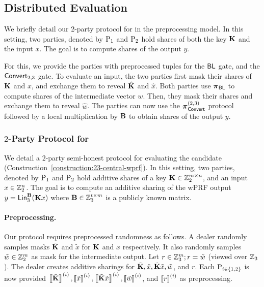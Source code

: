 \subsection{Distributed Evaluation}
\label{subsec:distributed_protocol}
\label{subsec:2pc-wprf}
We briefly detail our 2-party protocol for \ttwPRF in the preprocessing model. In this setting, two parties, denoted by $\textnormal{P}_1$ and $\textnormal{P}_2$ hold shares of both the key $\mat{K}$ and the input $x$. The goal is to compute shares of the output $y$.

For this, we provide the parties with preprocessed tuples for the $\textnormal{\textsf{BL}}$ gate, and the $\textnormal{\textsf{Convert}}_{2,3}$ gate. To evaluate an input, the two parties first mask their shares of $\mat{K}$ and $x$, and exchange them to reveal $\hat{\mat{K}}$ and $\hat{x}$. Both parties use $\boldsymbol{\pi}_{\textnormal{\textsf{BL}}}$ to compute shares of the intermediate vector $w$. Then, they mask their shares and exchange them to reveal $\hat{w}$. The parties can now use the $\boldsymbol{\pi}_{\textnormal{\textsf{Convert}}}^{(2,3)}$ protocol followed by a local multiplication by $\mat{B}$ to obtain shares of the output $y$.
\fi



\iffull
\subsubsection{$2$-Party Protocol for \ttwPRF}
\label{subsec:2pc-wprf}
We detail a $2$-party semi-honest protocol for evaluating the \ttwPRF candidate (Construction~\ref{construction:23-central-wprf}). In this setting, two parties, denoted by $\textnormal{P}_1$ and $\textnormal{P}_2$ hold additive shares of a key $\mat{K} \in \Z_2^{m \times n}$, and an input $x \in \mathbb{Z}_2^n$. The goal is to compute an additive sharing of the wPRF output $y = \LMap^\mat{B}_3(\mat{K}x)$ where $\mat{B} \in \Z_3^{t \times m}$ is a publicly known matrix.


\paragraph{Preprocessing.}
Our protocol requires preprocessed randomness as follows. A dealer randomly samples masks $\tilde{\mat{K}}$ and $\tilde{x}$ for $\mat{K}$ and $x$ respectively. It also randomly samples $\tilde{w} \in \mathbb{Z}_2^m$ as mask for the intermediate output. Let $r \in \mathbb{Z}_3^m; r = \tilde{w}$ (viewed over $\mathbb{Z}_3$). The dealer creates additive sharings for $\tilde{\mat{K}}, \tilde{x}, \tilde{\mat{K}}\tilde{x}, \tilde{w}$, and $r$. Each $\textnormal{P}_{i\in \{1,2\}}$ is now provided $\sharei{\tilde{\mat{K}}}, \sharei{\tilde{x}}, \sharei{\tilde{\mat{K}}\tilde{x}}, \sharei{\tilde{w}}$, and $\left\llbracket r \right\rrbracket^{(i)}$ as preprocessing.

